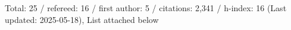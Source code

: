 Total: 25 / refereed: 16 / first author: 5 / citations: 2,341 / h-index: 16 (Last updated: 2025-05-18), List attached below